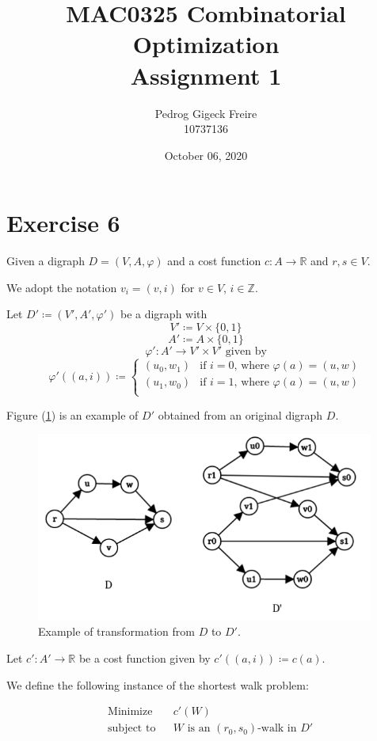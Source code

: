 \documentclass[a4paper,10pt, leqno]{article}
\title{MAC0325 Combinatorial Optimization \\
        \large Assignment 1 }
\author{Pedrog Gigeck Freire \\
        10737136}
\date{October 06, 2020}
\let\oldref\ref
\renewcommand{\ref}[1]{(\oldref{#1})}
\begin{document}
\maketitle

\section*{Exercise 6}
Given a digraph $D = (V, A, \varphi)$ and a cost 
function  $c : A \to \mathbb{R}$ and $r, s \in V$.

We adopt the notation $v_i = (v, i)$ for $v \in V$, $i \in \mathbb{Z}$.

Let $D' \coloneqq (V', A', \varphi')$ be a digraph with 
$$V' \coloneqq V \times \{0, 1\} $$
$$A' \coloneqq A \times \{0, 1\} $$
$$\varphi' : A' \to V' \times V' \text{ given by}$$
$$\varphi'((a, i)) \coloneqq
\left\{
	\begin{array}{ll}
		(u_0, w_1)  & \mbox{if } i = 0 \text{, where } \varphi(a) = (u, w) \\
		(u_1, w_0)  & \mbox{if } i = 1 \text{, where } \varphi(a) = (u, w) \\
	\end{array}
\right.$$

Figure \ref{fig:graph1} is an example of $D'$ obtained from an original digraph $D$.

\begin{figure}[h]
\centering
  \includegraphics[width=30em]{graph.png}
  \caption{Example of transformation from $D$ to $D'$.}
  \label{fig:graph1}
\end{figure}

Let $c' : A' \to \mathbb{R}$ be a cost function given by
$c'((a, i)) \coloneqq c(a)$.

We define the following instance of the shortest walk problem:

\begin{equation}
\tag{6.2}\label{swp}
    \begin{aligned}
    & \text{Minimize}
    & & c'(W) \\
    & \text{subject to}
    & & W \text{ is an $(r_0, s_0)$-walk in } D' 
    \end{aligned}
\end{equation} 
\end{document}
